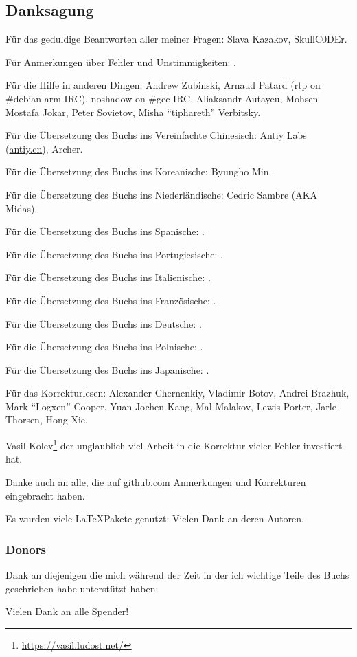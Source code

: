 \subsection*{Danksagung}

Für das geduldige Beantworten aller meiner Fragen: Slava  Kazakov, SkullC0DEr.

Für Anmerkungen über Fehler und Unstimmigkeiten: \PeopleMistakesInaccuracies{}.

Für die Hilfe in anderen Dingen:
Andrew Zubinski,
Arnaud Patard (rtp on \#debian-arm IRC),
noshadow on \#gcc IRC,
Aliaksandr Autayeu,
Mohsen Mostafa Jokar,
Peter Sovietov,
Misha ``tiphareth'' Verbitsky.

Für die Übersetzung des Buchs ins Vereinfachte Chinesisch:
Antiy Labs (\href{http://antiy.cn}{antiy.cn}), Archer.

Für die Übersetzung des Buchs ins Koreanische: Byungho Min.

Für die Übersetzung des Buchs ins Niederländische: Cedric Sambre (AKA Midas).

Für die Übersetzung des Buchs ins Spanische: \PeopleSpanishTranslators{}.

Für die Übersetzung des Buchs ins Portugiesische: \PeoplePTBRTranslators{}.

Für die Übersetzung des Buchs ins Italienische: \PeopleItalianTranslators{}.

Für die Übersetzung des Buchs ins Französische: \PeopleFrenchTranslators{}.

Für die Übersetzung des Buchs ins Deutsche: \PeopleGermanTranslators{}.

Für die Übersetzung des Buchs ins Polnische: \PeoplePolishTranslators{}.

Für die Übersetzung des Buchs ins Japanische: \PeopleJapaneseTranslators{}.

Für das Korrekturlesen:
Alexander  Chernenkiy,
Vladimir Botov,
Andrei Brazhuk,
Mark ``Logxen'' Cooper, Yuan Jochen Kang, Mal Malakov, Lewis Porter, Jarle Thorsen, Hong Xie.

Vasil Kolev\footnote{\url{https://vasil.ludost.net/}} der unglaublich viel Arbeit in die Korrektur vieler Fehler investiert hat.

Danke auch an alle, die auf github.com Anmerkungen und Korrekturen eingebracht haben.

Es wurden viele \LaTeX\-Pakete genutzt: Vielen Dank an deren Autoren.

\subsubsection*{Donors}

Dank an diejenigen die mich während der Zeit in der ich wichtige Teile des Buchs geschrieben habe
unterstützt haben:



Vielen Dank an alle Spender!
